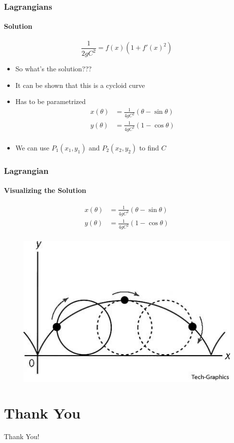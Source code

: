 \documentclass[12pt]{beamer}
\begin{document}
\begin{frame}
\frametitle{Lagrangians}
\framesubtitle{Solution}
$$\frac{1}{2gC^2} = f(x) \left (1 + f'(x)^2 \right )$$
\pause
\begin{itemize}
    \item So what's the solution???
    \pause
    \item It can be shown that this is a cycloid curve
    \pause
    \item Has to be parametrized
    \begin{align*}
    x (\theta) &= \frac{1}{4gC^2} \left (\theta - \sin{\theta} \right) \\
    y (\theta) &= \frac{1}{4gC^2} \left (1 - \cos{\theta} \right) \\
    \end{align*}
    \pause
    \item We can use $P_1 (x_1, y_1)$ and $P_2 (x_2, y_2)$ to find $C$
\end{itemize}
\end{frame}

\begin{frame}
\frametitle{Lagrangian}
\framesubtitle{Visualizing the Solution}
\begin{align*}
    x (\theta) &= \frac{1}{4gC^2} \left (\theta - \sin{\theta} \right) \\
    y (\theta) &= \frac{1}{4gC^2} \left (1 - \cos{\theta} \right) \\
\end{align*}
\begin{figure}[b]
\pause
\includegraphics[scale = 0.3]{Cycloid.jpg}
\end{figure}
\end{frame}

\section{Thank You}
\begin{frame}
\centering \Large Thank You!
\end{frame}
\end{document}
